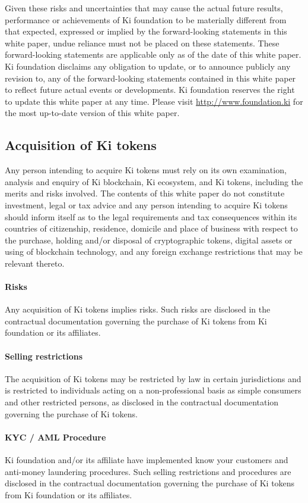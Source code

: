 Given these risks and uncertainties that may cause the actual future results, performance or achievements of Ki foundation to be materially different from that expected, expressed or implied by the forward-looking statements in this white paper, undue reliance must not be placed on these statements. 
These forward-looking statements are applicable only as of the date of this white paper. Ki foundation disclaims any obligation to update, or to announce publicly any revision to, any of the forward-looking statements contained in this white paper to reflect future actual events or developments.
Ki foundation reserves the right to update this white paper at any time. Please visit \url{http://www.foundation.ki} for the most up-to-date version of this white paper.
\subsection{Acquisition of Ki tokens}
Any person intending to acquire Ki tokens must rely on its own examination, analysis and enquiry of Ki blockchain, Ki ecosystem, and Ki tokens, including the merits and risks involved. The contents of this white paper do not constitute investment, legal or tax advice and any person intending to acquire Ki tokens should inform itself as to the legal requirements and tax consequences within its countries of citizenship, residence, domicile and place of business with respect to the purchase, holding and/or disposal of cryptographic tokens, digital assets or using of blockchain technology, and any foreign exchange restrictions that may be relevant thereto.
\paragraph{Risks}
Any acquisition of Ki tokens implies risks. Such risks are disclosed in the contractual documentation governing the purchase of Ki tokens from Ki foundation or its affiliates.
\paragraph{Selling restrictions}
The acquisition of Ki tokens may be restricted by law in certain jurisdictions and is restricted to individuals acting on a non-professional basis as simple consumers and other restricted persons, as disclosed in the contractual documentation governing the purchase of Ki tokens.
\paragraph{KYC / AML Procedure}
Ki foundation and/or its affiliate have implemented know your customers and anti-money laundering procedures. Such selling restrictions and procedures are disclosed in the contractual documentation governing the purchase of Ki tokens from Ki foundation or its affiliates.
